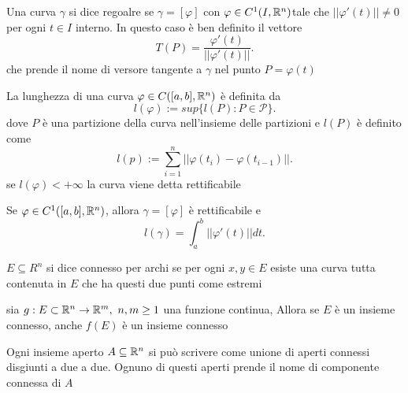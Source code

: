 \documentclass[12px]{article}
\begin{document}
	\newpage
	\begin{defi}
		Una curva $\gamma$ si dice regoalre se $\gamma = [ \varphi]$ con $ \varphi\in C^1(I,\mathbb{R}^n)$tale che $|| \varphi'(t) || \neq 0$ per ogni $t\in I$ interno. In questo caso è ben definito il vettore
		\[
			T(P) = \frac{ \varphi'(t)}{|| \varphi'(t)||}
		.\] 
		che prende il nome di versore tangente a $\gamma$ nel punto $P = \varphi(t)$
	\end{defi}
	\begin{defi}
		La lunghezza di una curva $ \varphi\in C([a,b],\mathbb{R}^n)$ è definita da
		\[
			l( \varphi):=sup \{l(P):P\in\mathcal P\}
		.\] 
		dove $P$ è una partizione della curva nell'insieme delle partizioni e $l(P)$ è definito come
		 \[
			 l(p):= \sum^n_{i=1}|| \varphi(t_i)- \varphi(t_{i-1})||
		.\] 
		se $l ( \varphi) <+\infty$ la curva viene detta rettificabile
	\end{defi}
	\begin{teo}
		Se $ \varphi \in C^1([a,b],\mathbb{R}^n)$, allora $\gamma = [ \varphi]$ è rettificabile e 
		\[
		l(\gamma) = \int_a^b|| \varphi'(t)||dt
		.\] 
	\end{teo}
	\begin{defi}
		$E\subseteq R^n$ si dice connesso per archi se per ogni  $x,y\in E$ esiste una curva tutta contenuta in  $E$ che ha questi due punti come estremi
	\end{defi}
	\begin{teo}
		sia $g:E\subset \R^n \rightarrow\R^m,\ n,m\geq 1$ una funzione continua, Allora se $E$ è un insieme connesso, anche $f(E)$ è un insieme connesso
	\end{teo}
	\begin{teo}
		Ogni insieme aperto $A\subseteq \mathbb{R}^n$ si  può scrivere come unione di aperti connessi disgiunti a due a due. Ognuno di questi aperti prende il nome di componente connessa di $A$
	\end{teo}
	\newpage
\end{document}
